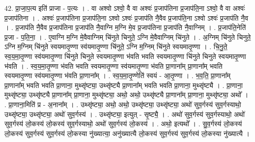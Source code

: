 \documentclass[17pt]{extarticle}
\begin{document}
42. प्रा॒जा॒प॒त्य इति॑ प्राजा - प॒त्यः । . वा अश्वो ऽश्वो॒ वै वा अश्वः॑ प्र॒जाप॑तिना प्र॒जाप॑ति॒ना ऽश्वो॒ वै वा अश्वः॑ प्र॒जाप॑तिना । . अश्वः॑ प्र॒जाप॑तिना प्र॒जाप॑ति॒ना ऽश्वो ऽश्वः॑ प्र॒जाप॑ति नै॒वैव प्र॒जाप॑ति॒ना ऽश्वो ऽश्वः॑ प्र॒जाप॑ति नै॒व । . प्र॒जाप॑ति नै॒वैव प्र॒जाप॑तिना प्र॒जाप॑ति नै॒वाग्नि म॒ग्नि मे॒व प्र॒जाप॑तिना प्र॒जाप॑ति नै॒वाग्निम् । . प्र॒जाप॑ति॒नेति॑ प्र॒जा - प॒ति॒ना॒ । . ए॒वाग्नि म॒ग्नि मे॒वैवाग्निम् चि॑नुते चिनुते॒ ऽग्नि मे॒वैवाग्निम् चि॑नुते । . अ॒ग्निम् चि॑नुते चिनुते॒ ऽग्नि म॒ग्निम् चि॑नुते स्वयमातृ॒ण्णा स्व॑यमातृ॒ण्णा चि॑नुते॒ ऽग्नि म॒ग्निम् चि॑नुते स्वयमातृ॒ण्णा । . चि॒नु॒ते॒ स्व॒य॒मा॒तृ॒ण्णा स्व॑यमातृ॒ण्णा चि॑नुते चिनुते स्वयमातृ॒ण्णा भ॑वति भवति स्वयमातृ॒ण्णा चि॑नुते चिनुते स्वयमातृ॒ण्णा भ॑वति । . स्व॒य॒मा॒तृ॒ण्णा भ॑वति भवति स्वयमातृ॒ण्णा स्व॑यमातृ॒ण्णा भ॑वति प्रा॒णाना᳚म् प्रा॒णाना᳚म् भवति स्वयमातृ॒ण्णा स्व॑यमातृ॒ण्णा भ॑वति प्रा॒णाना᳚म् । . स्व॒य॒मा॒तृ॒ण्णेति॑ स्वयं - आ॒तृ॒ण्णा । . भ॒व॒ति॒ प्रा॒णाना᳚म् प्रा॒णाना᳚म् भवति भवति प्रा॒णाना॒ मुथ्सृ॑ष्ट्या॒ उथ्सृ॑ष्ट्यै प्रा॒णाना᳚म् भवति भवति प्रा॒णाना॒ मुथ्सृ॑ष्ट्यै । . प्रा॒णाना॒ मुथ्सृ॑ष्ट्या॒ उथ्सृ॑ष्ट्यै प्रा॒णाना᳚म् प्रा॒णाना॒ मुथ्सृ॑ष्ट्या॒ अथो॒ अथो॒ उथ्सृ॑ष्ट्यै प्रा॒णाना᳚म् प्रा॒णाना॒ मुथ्सृ॑ष्ट्या॒ अथो᳚ । . प्रा॒णाना॒मिति॑ प्र - अ॒नाना᳚म् । . उथ्सृ॑ष्ट्या॒ अथो॒ अथो॒ उथ्सृ॑ष्ट्या॒ उथ्सृ॑ष्ट्या॒ अथो॑ सुव॒र्गस्य॑ सुव॒र्गस्याथो॒ उथ्सृ॑ष्ट्या॒ उथ्सृ॑ष्ट्या॒ अथो॑ सुव॒र्गस्य॑ । . उथ्सृ॑ष्ट्या॒ इत्युत् - सृ॒ष्ट्यै॒ । . अथो॑ सुव॒र्गस्य॑ सुव॒र्गस्याथो॒ अथो॑ सुव॒र्गस्य॑ लो॒कस्य॑ लो॒कस्य॑ सुव॒र्गस्याथो॒ अथो॑ सुव॒र्गस्य॑ लो॒कस्य॑ । . अथो॒ इत्यथो᳚ । . सु॒व॒र्गस्य॑ लो॒कस्य॑ लो॒कस्य॑ सुव॒र्गस्य॑ सुव॒र्गस्य॑ लो॒कस्या नु॑ख्यात्या॒ अनु॑ख्यात्यै लो॒कस्य॑ सुव॒र्गस्य॑ सुव॒र्गस्य॑ लो॒कस्या नु॑ख्यात्यै । \newline
\end{document}
